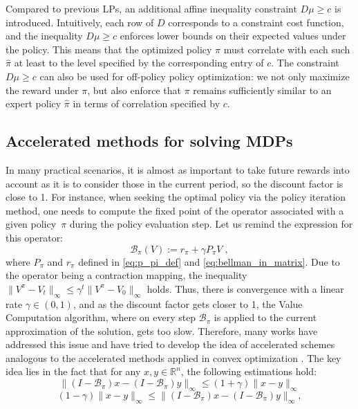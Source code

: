 \documentclass{article}
\numberwithin{equation}{section}
\newcommand{\eqsp}{\;}
\begin{document}
Compared to previous LPs, an additional affine inequality constraint $D\mu\geq c$ is introduced. Intuitively, each row of $D$ corresponds to a constraint cost function, and the inequality $D\mu\ge c$ enforces lower bounds on their expected values under the policy. This means that the optimized policy $\pi$ must correlate with each such $\hat{\pi}$ at least to the level specified by the corresponding entry of $c$. The constraint $D\mu\geq c$ can also be used for off-policy policy optimization: we not only maximize the reward under $\pi$, but also enforce that $\pi$ remains sufficiently similar to an expert policy $\hat{\pi}$ in terms of correlation specified by $c$. 

\subsection{Accelerated methods for solving MDPs}
In many practical scenarios, it is almost as important to take future rewards into account as it is to consider those in the current period, so the discount factor is close to 1. For instance, when seeking the optimal policy via the policy iteration method, one needs to compute the fixed point of the operator associated with a given policy~$\pi$ during the policy evaluation step.  Let us remind the expression for this operator:
\begin{equation}
    \mathcal{B}_{\pi}(V) := r_{\pi} + \gamma P_{\pi}V\eqsp,
\end{equation}
where \(P_\pi\) and \(r_\pi\) defined in \eqref{eq:p_pi_def} and \eqref{eq:bellman_in_matrix}.
Due to the operator being a contraction mapping, the inequality $\|V^{\pi} - V_t\|_{\infty} \leq \gamma^t \|V^{\pi} - V_0\|_{\infty}$ holds. Thus, there is convergence with a linear rate $\gamma \in (0, 1)$, and as the discount factor gets closer to 1, the Value Computation algorithm, where on every step $\mathcal{B}_{\pi}$ is applied to the current approximation of the solution, gets too slow.  Therefore, many works have addressed this issue and have tried to develop the idea of accelerated schemes analogous to the accelerated methods applied in convex optimization \citep[\S 2.2]{nesterov2018lectures}. The key idea lies in the fact that for any $x, y \in \mathbb{R}^n$, the following estimations hold:
\begin{equation*}
    \|(I - \mathcal{B}_{\pi})x - (I - \mathcal{B}_{\pi})y\|_{\infty} \leq (1 + \gamma) \|x - y\|_{\infty}  
\end{equation*}
\begin{equation*}
    (1 - \gamma) \|x - y\|_{\infty} \leq \|(I - \mathcal{B}_{\pi})x - (I - \mathcal{B}_{\pi})y\|_{\infty},
\end{equation*}
\end{document}
